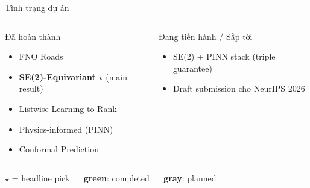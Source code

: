 \documentclass[aspectratio=169,10pt]{beamer}
\begin{document}
\begin{frame}{Tình trạng dự án}
\begin{columns}[T]
\begin{block}{Đã hoàn thành}
\scriptsize
\begin{itemize}
  \item FNO Roads
  \item \textbf{SE(2)-Equivariant} $\star$ (main result)
  \item Listwise Learning-to-Rank
  \item Physics-informed (PINN)
  \item Conformal Prediction
\end{itemize}
\end{block}

\begin{block}{Đang tiến hành / Sắp tới}
\scriptsize
\begin{itemize}
  \item SE(2) + PINN stack (triple guarantee)
  \item Draft submission cho NeurIPS 2026
\end{itemize}
\end{block}
\end{columns}

\vspace{1em}
\centering\scriptsize
$\star$ = headline pick $\quad$
\textcolor{success!50!black}{\textbf{green}}: completed $\quad$
\textcolor{mDarkTeal}{\textbf{gray}}: planned
\end{frame}
\end{document}
